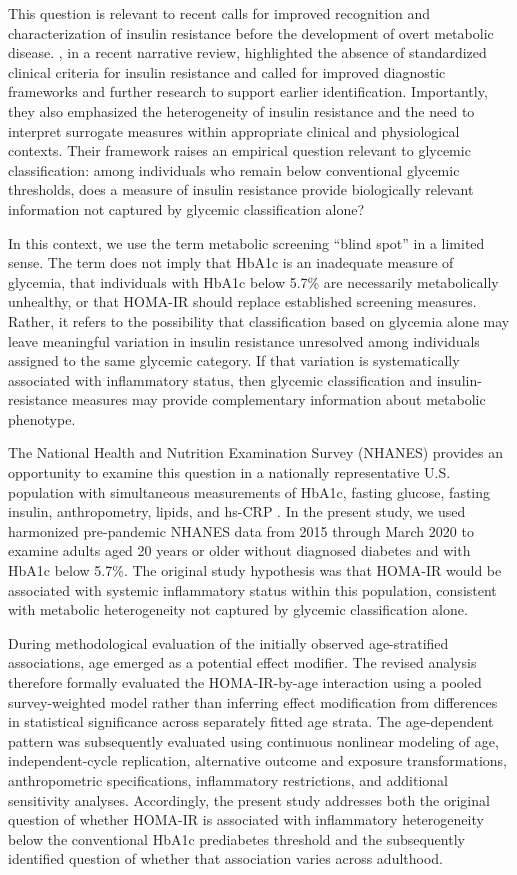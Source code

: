 \documentclass[11pt]{article}
\begin{document}
This question is relevant to recent calls for improved recognition and
characterization of insulin resistance before the development of overt
metabolic disease. \citet{Rodzen2026}, in a recent narrative review,
highlighted the absence of standardized clinical criteria for insulin
resistance and called for improved diagnostic frameworks and further
research to support earlier identification. Importantly, they also
emphasized the heterogeneity of insulin resistance and the need to interpret
surrogate measures within appropriate clinical and physiological contexts.
Their framework raises an empirical question relevant to glycemic
classification: among individuals who remain below conventional glycemic thresholds, does a
measure of insulin resistance provide biologically relevant information not
captured by glycemic classification alone?

In this context, we use the term metabolic screening ``blind spot'' in a
limited sense. The term does not imply that HbA1c is an inadequate measure
of glycemia, that individuals with HbA1c below 5.7\% are necessarily
metabolically unhealthy, or that HOMA-IR should replace established
screening measures. Rather, it refers to the possibility that classification
based on glycemia alone may leave meaningful variation in insulin resistance
unresolved among individuals assigned to the same glycemic category. If
that variation is systematically associated with inflammatory status, then
glycemic classification and insulin-resistance measures may provide
complementary information about metabolic phenotype.

The National Health and Nutrition Examination Survey (NHANES) provides an
opportunity to examine this question in a nationally representative U.S.
population with simultaneous measurements of HbA1c, fasting glucose,
fasting insulin, anthropometry, lipids, and hs-CRP \citep{Akinbami2022NHANES}. In the present study,
we used harmonized pre-pandemic NHANES data from 2015 through March 2020 to
examine adults aged 20 years or older without diagnosed diabetes and with
HbA1c below 5.7\%. The original study hypothesis was that HOMA-IR would be
associated with systemic inflammatory status within this population,
consistent with metabolic heterogeneity not captured by glycemic
classification alone.

During methodological evaluation of the initially observed age-stratified
associations, age emerged as a potential effect modifier. The revised
analysis therefore formally evaluated the HOMA-IR-by-age interaction using
a pooled survey-weighted model rather than inferring effect modification
from differences in statistical significance across separately fitted age
strata. The age-dependent pattern was subsequently evaluated using
continuous nonlinear modeling of age, independent-cycle replication,
alternative outcome and exposure transformations, anthropometric
specifications, inflammatory restrictions, and additional sensitivity
analyses. Accordingly, the present study addresses both the original
question of whether HOMA-IR is associated with inflammatory heterogeneity
below the conventional HbA1c prediabetes threshold and the subsequently
identified question of whether that association varies across adulthood.
\end{document}
